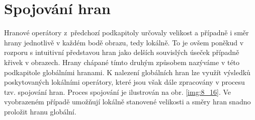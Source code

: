 

\section*{Spojování hran}

Hranové operátory z~předchozí podkapitoly určovaly velikost a případně i směr hrany jednotlivě v každém bodě obrazu, tedy lokálně. To je ovšem poněkud v rozporu s intuitivní představou hran jako delších souvislých úseček případně křivek v obrazech. Hrany chápané tímto druhým způsobem nazýváme v této podkapitole globálními hranami. K nalezení globálních hran lze využít výsledků poskytovaných lokálními operátory, které jsou však dále zpracovány v procesu tzv. spojování hran. Proces spojování je ilustrován na obr. \ref{img:8_16}. Ve vyobrazeném případě umožňují lokálně stanovené velikosti a směry hran snadno proložit hranu globální.

